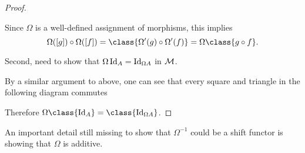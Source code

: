 \begin{proof}
\begin{center}
    \end{center}
    Since \( \Omega \) is a well-defined assignment of morphisms, this implies
    \[
        \Omega([g]) \circ \Omega([f]) = \class{\Omega'(g) \circ \Omega'(f)} = \Omega \class{g \circ f}.
    \]

    Second, need to show that \( \Omega \operatorname{Id}_A = \operatorname{Id}_{\Omega A} \) in \( {\mathcal{M}} \).

    By a similar argument to above, one can see that every square and triangle in the following diagram commutes
    \begin{center}
    \end{center}
    Therefore \( \Omega \class{\Id_A} = \class{\Id_{\Omega A}} \).
\end{proof}

An important detail still missing to show that \( \Omega^{-1} \) could be a shift functor is showing that \( \Omega \) is additive.

